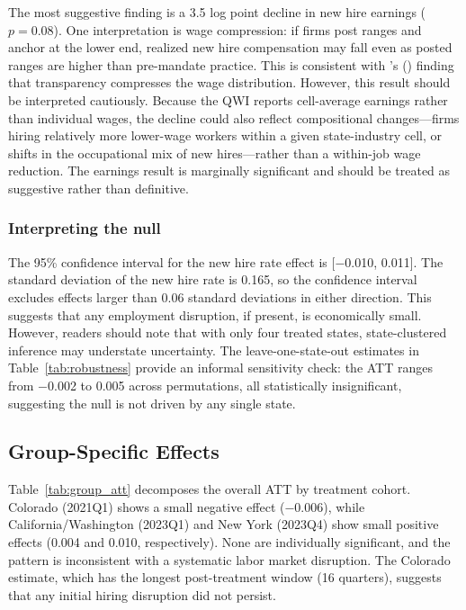 \documentclass[12pt]{article}
\begin{document}
The most suggestive finding is a 3.5 log point decline in new hire earnings ($p = 0.08$). One interpretation is wage compression: if firms post ranges and anchor at the lower end, realized new hire compensation may fall even as posted ranges are higher than pre-mandate practice. This is consistent with \citeauthor{cullen2024equilibrium}'s (\citeyear{cullen2024equilibrium}) finding that transparency compresses the wage distribution. However, this result should be interpreted cautiously. Because the QWI reports cell-average earnings rather than individual wages, the decline could also reflect compositional changes---firms hiring relatively more lower-wage workers within a given state-industry cell, or shifts in the occupational mix of new hires---rather than a within-job wage reduction. The earnings result is marginally significant and should be treated as suggestive rather than definitive.

\subsubsection*{Interpreting the null} The 95\% confidence interval for the new hire rate effect is [$-$0.010, 0.011]. The standard deviation of the new hire rate is 0.165, so the confidence interval excludes effects larger than 0.06 standard deviations in either direction. This suggests that any employment disruption, if present, is economically small. However, readers should note that with only four treated states, state-clustered inference may understate uncertainty. The leave-one-state-out estimates in Table~\ref{tab:robustness} provide an informal sensitivity check: the ATT ranges from $-$0.002 to 0.005 across permutations, all statistically insignificant, suggesting the null is not driven by any single state.

\subsection{Group-Specific Effects}



Table~\ref{tab:group_att} decomposes the overall ATT by treatment cohort. Colorado (2021Q1) shows a small negative effect ($-$0.006), while California/Washington (2023Q1) and New York (2023Q4) show small positive effects (0.004 and 0.010, respectively). None are individually significant, and the pattern is inconsistent with a systematic labor market disruption. The Colorado estimate, which has the longest post-treatment window (16 quarters), suggests that any initial hiring disruption did not persist.
\end{document}
